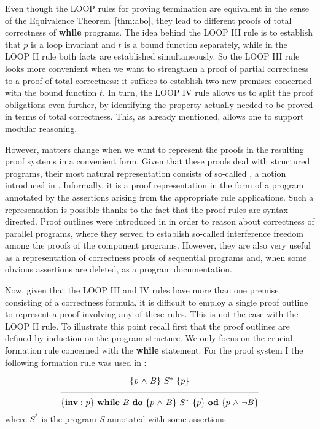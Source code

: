 \documentclass[manuscript, screen, review]{acmart}
\begin{document}
Even though the LOOP rules for proving termination are equivalent in
the sense of the Equivalence Theorem~\ref{thm:abo}, they lead to
different proofs of total correctness of \textbf{while} programs.
The idea behind the LOOP III rule is to establish that $p$ is a loop
invariant and $t$ is a bound function separately, while in the LOOP II
rule both facts are established simultaneously. So the LOOP III rule
looks more convenient when we want to strengthen a proof of partial
correctness to a proof of total correctness: it suffices to establish
two new premises concerned with the bound function $t$.  In turn, the
LOOP IV rule allows us to split the proof obligations even further, by
identifying the property actually needed to be proved in terms of
total correctness.  This, as already mentioned, allows one to support
modular reasoning.

However, matters change when we want to represent the proofs in the
resulting proof systems  in a convenient form. Given
that these proofs deal with structured programs, their most natural
representation consists of so-called , a notion
introduced in \cite{OG76a}.  Informally, it is a proof representation
in the form of a program annotated by the assertions arising from the
appropriate rule applications. Such a representation is possible
thanks to the fact that the proof rules are syntax directed. Proof
outlines were introduced in \cite{OG76a} in order to reason about
correctness of parallel programs, where they served to establish
so-called interference freedom among the proofs of the component
programs. However, they are also very useful as a representation of
correctness proofs of sequential programs and, when some obvious
assertions are deleted, as a program documentation.

Now, given that the LOOP III and IV rules have more than one premise
consisting of a correctness formula, it is difficult to employ
a single proof outline to represent a proof involving any of these rules.
This is not the case with the LOOP II rule. To illustrate this point
recall first that the proof outlines are defined by induction on the program structure.
We only focus on the crucial formation rule concerned with the \textbf{while} statement.
For the proof system I the following formation rule was used in \cite{ABO09}:

\[
\frac{\raisebox{2mm}{$ \HT{p \A B}{S^*}{p}$}}
            {\raisebox{-2mm}{$\HT{{\bf inv:}\ p}
                 {\WDD{B}{\HT{p \A B}{S^*}{p}}}
                 {p \A \neg B}$}}
\]
where $S^*$ is the program $S$ annotated with some assertions.
\III
\end{document}
